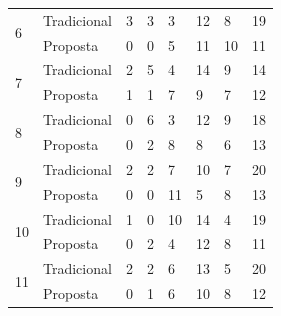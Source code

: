 \begin{table}[h]
\begin{tabular}{|p{1.5cm}|p{1.8cm}|p{2.2cm}|p{0.6cm}|p{0.6cm}|p{0.6cm}|p{2.3cm}|p{2cm}|}
\hline
\multirow{2}{*}{6}          & Tradicional & 3                   & 3                     & 3                         & 12                    & 8                   & 19           \\
                            & Proposta    & 0                   & 0                     & 5                         & 11                    & 10                  & 11           \\
\hline
\multirow{2}{*}{7}          & Tradicional & 2                   & 5                     & 4                         & 14                    & 9                   & 14           \\
                            & Proposta    & 1                   & 1                     & 7                         & 9                     & 7                   & 12           \\
\hline
\multirow{2}{*}{8}          & Tradicional & 0                   & 6                     & 3                         & 12                    & 9                   & 18           \\
                            & Proposta    & 0                   & 2                     & 8                         & 8                     & 6                   & 13           \\
\hline
\multirow{2}{*}{9}          & Tradicional & 2                   & 2                     & 7                         & 10                    & 7                   & 20           \\
                            & Proposta    & 0                   & 0                     & 11                        & 5                     & 8                   & 13           \\
\hline
\multirow{2}{*}{10}         & Tradicional & 1                   & 0                     & 10                        & 14                    & 4                   & 19           \\
                            & Proposta    & 0                   & 2                     & 4                         & 12                    & 8                   & 11           \\
\hline
\multirow{2}{*}{11}         & Tradicional & 2                   & 2                     & 6                         & 13                    & 5                   & 20           \\
                            & Proposta    & 0                   & 1                     & 6                         & 10                    & 8                   & 12           \\

\end{tabular}
\end{table}
